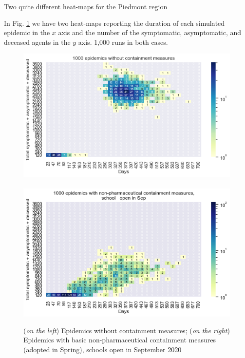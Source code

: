 \documentclass[8pt]{beamer}
\begin{document}
\begin{frame}{Two quite different heat-maps for the Piedmont region}

In Fig. \ref{2HM} we have two heat-maps reporting the duration of each simulated epidemic in the $x$ axis and the number of the symptomatic, asymptomatic, and deceased agents in the $y$ axis. 1,000 runs in both cases.

\begin{figure}[H]
\center
\includegraphics[scale=0.3]{HM30_readRunResults1k_noControl_plusHMlog.png}~~~\includegraphics[scale=0.3]{HM30_readRunResults1k_basicControl_schoolOpenSept_plusHMlog.png} 

\caption{(\emph{on the left}) Epidemics without containment measures;
 (\emph{on the right}) Epidemics with basic non-pharmaceutical containment measures (adopted in Spring), schools open in September 2020} 
\label{2HM}
\end{figure}


\end{frame}
\end{document}
